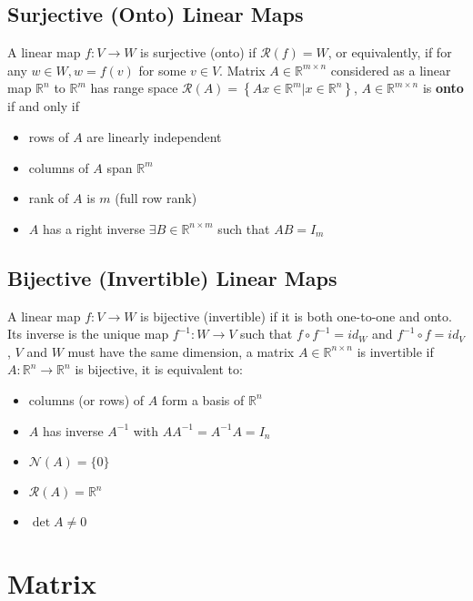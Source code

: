 \documentclass[10pt,a4paper,oneside]{article}
\begin{document}
\subsection{Surjective (Onto) Linear Maps}
A linear map $f:V\rightarrow W$ is surjective (onto) if $\mathcal{R}(f)=W$, or equivalently, if for any $w \in W, w=f(v)$ for some $v \in V$. Matrix $A \in \mathbb{R}^{m \times n}$ considered as a linear map $\mathbb{R}^{n}$ to $\mathbb{R}^{m}$ has range space
$\mathcal{R}(A)=\left\{A x \in \mathbb{R}^{m} | x \in \mathbb{R}^{n}\right\}$, $A\in\mathbb{R}^{m\times n}$ is \textbf{onto} if and only if
\begin{itemize}
\item rows of $A$ are linearly independent
\item columns of $A$ span $\mathbb{R}^{m}$
\item rank of $A$ is $m$ (full row rank)
\item $A$ has a right inverse $\exists B \in \mathbb{R}^{n \times m}$ such that $A B=I_{m}$
\end{itemize}

\subsection{Bijective (Invertible) Linear Maps}
A linear map $f : V \rightarrow W$ is bijective (invertible) if it is both one-to-one and onto. Its inverse is the unique map $f^{-1} : W \rightarrow V$ such that $f \circ f^{-1}=i d_W$ and $f^{-1} \circ f=i d_V$, $V$ and $W$ must have the same dimension, a matrix $A\in \mathbb{R}^{n\times n}$ is invertible if $A : \mathbb{R}^{n} \rightarrow \mathbb{R}^{n}$ is bijective, it is equivalent to: 
\begin{itemize}
\item columns (or rows) of $A$ form a basis of $\mathbb{R}^{n}$
\item $A$ has inverse $A^{-1}$ with $A A^{-1}=A^{-1} A=I_{n}$
\item $\mathcal{N}(A)=\{0\}$
\item $\mathcal{R}(A)=\mathbb{R}^{n}$
\item $\det A \neq 0$
\end{itemize}

\section{Matrix}
\end{document}

